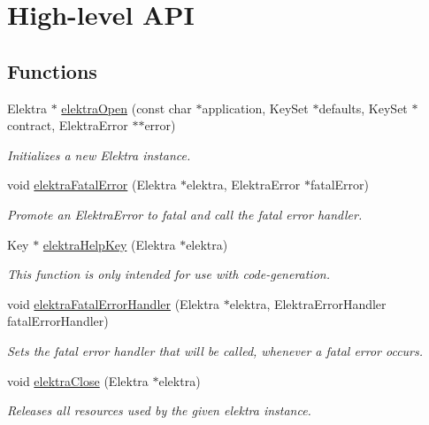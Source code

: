 \hypertarget{group__highlevel}{}\section{High-\/level A\+PI}
\label{group__highlevel}
\subsection*{Functions}
\begin{DoxyCompactItemize}
\item 
Elektra $\ast$ \hyperlink{group__highlevel_ga45de58b05c7a8ab02f6c54ddd31a56e1}{elektra\+Open} (const char $\ast$application, Key\+Set $\ast$defaults, Key\+Set $\ast$contract, Elektra\+Error $\ast$$\ast$error)
\begin{DoxyCompactList}\small\item\em Initializes a new Elektra instance. \end{DoxyCompactList}\item 
void \hyperlink{group__highlevel_ga57d87ff6defe4db402b772ab2a0025f9}{elektra\+Fatal\+Error} (Elektra $\ast$elektra, Elektra\+Error $\ast$fatal\+Error)
\begin{DoxyCompactList}\small\item\em Promote an Elektra\+Error to fatal and call the fatal error handler. \end{DoxyCompactList}\item 
Key $\ast$ \hyperlink{group__highlevel_ga5d1462351e703f59b8faf57955219eb8}{elektra\+Help\+Key} (Elektra $\ast$elektra)
\begin{DoxyCompactList}\small\item\em This function is only intended for use with code-\/generation. \end{DoxyCompactList}\item 
void \hyperlink{group__highlevel_ga496441e9e1dd80ed14a239dfc4c08c40}{elektra\+Fatal\+Error\+Handler} (Elektra $\ast$elektra, Elektra\+Error\+Handler fatal\+Error\+Handler)
\begin{DoxyCompactList}\small\item\em Sets the fatal error handler that will be called, whenever a fatal error occurs. \end{DoxyCompactList}\item 
void \hyperlink{group__highlevel_ga9b688b7250e5f9d8ea6701cc2cc269af}{elektra\+Close} (Elektra $\ast$elektra)
\begin{DoxyCompactList}\small\item\em Releases all resources used by the given elektra instance. \end{DoxyCompactList}\item 
$$
\end{DoxyCompactItemize}
